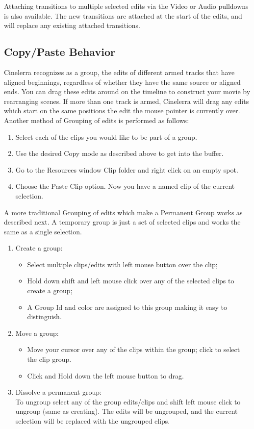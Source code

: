 Attaching transitions to multiple selected edits via the Video or Audio pulldowns is also available.  The new transitions are attached at the start of the edits, and will replace any existing attached transitions.

\subsection{Copy/Paste Behavior}%
\label{sub:copy_paste_behavior}

Cinelerra recognizes as a group, the edits of different armed tracks that have aligned beginnings, regardless of whether they have the same source or aligned ends.  You can drag these edits around on the timeline to construct your movie by rearranging scenes. If more than one track is armed, Cinelerra will drag any edits which start on the same positions the edit the mouse pointer is currently over. \\
Another method of Grouping of edits is performed as follows:
\begin{enumerate}
    \item Select each of the clips you would like to be part of a group.
    \item Use the desired Copy mode as described above to get into the buffer.
    \item Go to the Resources window Clip folder and right click on an empty spot.
    \item Choose the Paste Clip option.  Now you have a named clip of the current selection.
\end{enumerate}
A more traditional Grouping of edits which make a Permanent Group works as described next.  A temporary group is just a set of selected clips and works the same as a single selection.
\begin{enumerate}
    \item Create a group:
    \begin{itemize}[noitemsep]
        \item Select multiple clips/edits with left mouse button over the clip;
        \item Hold down shift and left mouse click over any of the selected clips to create a group;
        \item A Group Id and color are assigned to this group making it easy to distinguish.
    \end{itemize}
    \item Move a group:
    \begin{itemize}[noitemsep]
        \item Move your cursor over any of the clips within the group;  click to select the clip group.
        \item Click and Hold down the left mouse button to drag.
    \end{itemize}
    \item Dissolve a permanent group:\\
    To ungroup select any of the group edits/clips and shift left mouse click to ungroup (same as creating).
    The edits will be ungrouped, and the current selection will be replaced with the ungrouped clips.
\end{enumerate}
